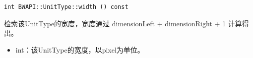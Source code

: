 \begin{tcolorbox}[colback=white, colframe=black!60!white, title=width(), arc=0mm]
    \begin{verbatim}
int BWAPI::UnitType::width () const
    \end{verbatim}
    检索该UnitType的宽度，宽度通过   dimensionLeft + dimensionRight + 1   计算得出。
    \begin{return}
        \begin{itemize}
            \item int：该UnitType的宽度，以pixel为单位。
            \end{itemize}
    \end{return}
\end{tcolorbox}

